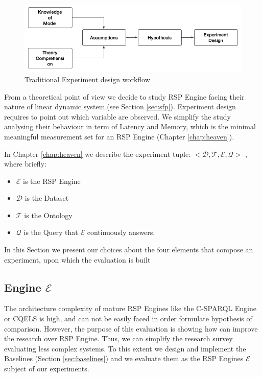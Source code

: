 \begin{figure}[tbh]
  \centering
	\includegraphics[width=\linewidth]{images/experiment-design}
	\caption{Traditional Experiment design workflow} 
  	\label{fig:experiment-design}
\end{figure}


From a theoretical point of view we decide to study RSP Engine facing their nature of linear dynamic system.(see Section \ref{sec:sfp}). Experiment design requires to point out which variable are observed. We simplify the study analysing their behaviour in term of Latency and Memory, which is the minimal meaningful measurement set for an RSP Engine (Chapter \ref{chap:heaven}).

In Chapter \ref{chap:heaven} we describe the experiment tuple: $<\mathcal{D}, \mathcal{T},\mathcal{E}, \mathcal{Q}>$ , where briefly:
\begin{itemize}
\item $\mathcal{E}$ is the RSP Engine
\item $\mathcal{D}$ is the Dataset 
\item $\mathcal{T}$ is the Ontology
\item $\mathcal{Q}$ is the Query that $\mathcal{E}$ continuously answers.
\end{itemize}

In this Section we present our choices about the four elements that compose an experiment, upon which the evaluation is built

\subsection{Engine $\mathcal{E}$}

The architecture complexity of mature RSP Engines like the C-SPARQL Engine or CQELS is high, and can not be easily faced in order formulate hypothesis of comparison. However, the purpose of this evaluation is showing how \name can improve the research over RSP Engine. Thus, we can simplify the research survey evaluating less complex systems. To this extent we design and implement the Baselines (Section \ref{sec:baselines}) and we evaluate them as the RSP Engines $\mathcal{E}$ subject of our experiments. 

